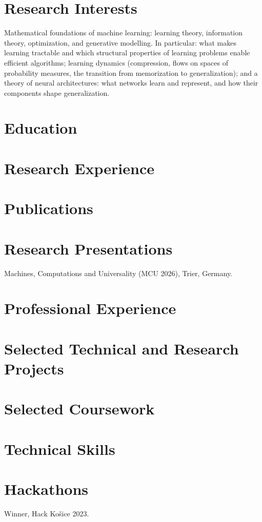 \documentclass[11pt,a4paper]{article}
\begin{document}
\cvheader

\section*{Research Interests}
Mathematical foundations of machine learning: learning theory, information theory, optimization, and generative modelling. In particular: what makes learning tractable and which structural properties of learning problems enable efficient algorithms; learning dynamics (compression, flows on spaces of probability measures, the transition from memorization to generalization); and a theory of neural architectures: what networks learn and represent, and how their components shape generalization.

\section*{Education}
\EducationPhD

\section*{Research Experience}
\RandomnessPhD
\vspace{2pt}
\ConformalThesisPhD
\vspace{2pt}
\ZechThesisPhD
\vspace{2pt}
\PrefixProgramsResearchPhD
\vspace{2pt}
\ConcretePhD

\newpage
\section*{Publications}
\PublicationsFull

\section*{Research Presentations}
Machines, Computations and Universality (MCU 2026), Trier, Germany.

\section*{Professional Experience}
\HtwoOPhD

\section*{Selected Technical and Research Projects}
\ProjectsPhD

\section*{Selected Coursework}
\SelectedCourseworkPhD

\section*{Technical Skills}
\SkillsPhD

\section*{Hackathons}
Winner, Hack Ko\v sice 2023.
\end{document}
